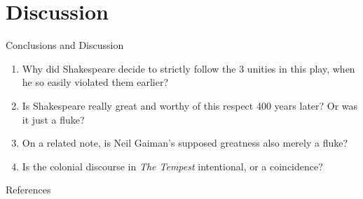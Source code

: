 \documentclass{beamer}
\begin{document}
  \section{Discussion}
  \begin{frame}{Conclusions and Discussion}
    \begin{enumerate}
    \item Why did Shakespeare decide to strictly follow the 3 unities in this play, when he so easily violated them earlier?
    \item Is Shakespeare really great and worthy of this respect 400 years later? Or was it just a fluke?
    \item On a related note, is Neil Gaiman's supposed greatness also merely a fluke?
    \item Is the colonial discourse in \emph{The Tempest} intentional, or a coincidence?
    \end{enumerate}
  \end{frame}

  \begin{frame}[allowframebreaks]{References}
  \footnotesize{
  
  
  }
  \end{frame}
\end{document}
